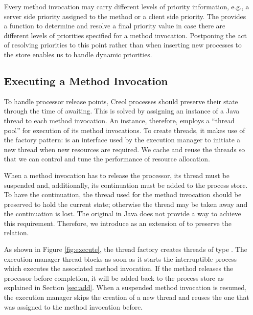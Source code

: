 Every method invocation may carry different levels of priority information,
e.g., a server side priority assigned to the method or a
client side priority. 
The  
provides a function to determine and
resolve a final priority value in case there are different levels of priorities
specified for a method invocation. 
Postponing the act of resolving priorities to this point rather than when inserting new processes to the store enables us to handle dynamic priorities.


\subsection{Executing a Method Invocation}

To handle processor release points, Creol processes should preserve
their state through the time of awaiting.
This is solved by assigning an instance of a Java thread to each method
invocation. 
An  instance, therefore, employs a ``thread pool''
for execution of its method invocations. 
To create threads, it makes use of the factory pattern:
 is an interface used by the execution manager to
initiate a new thread when new resources are required. 
We cache and reuse the threads so that we can control and tune the performance of resource allocation. 

When a method invocation has to release the processor, its thread must
be suspended and, additionally, its continuation must be added to the
process store. To have the continuation, the thread used for the method
invocation should be preserved to hold the current state; otherwise the
thread may be taken away and the continuation is lost.
The original  in Java does not provide a way to achieve this
requirement.
Therefore, we introduce  as an extension of
 to preserve the relation.


As shown in Figure \ref{fig:execute}, the thread factory creates threads of type  {}.
The execution manager thread blocks as soon as it starts the interruptible process which executes the associated  method invocation. 
If the method releases the processor before completion, it will be added back to the process store as explained in Section \ref{sec:add}.
When a suspended method invocation is resumed, the execution manager skips the creation of a new thread and  reuses the one that was assigned to the method invocation before.

